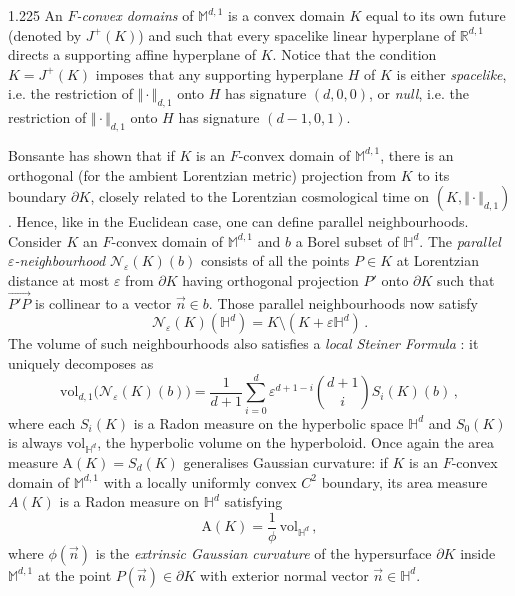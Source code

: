 \documentclass[reqno, a4paper]{amsart}
\numberwithin{equation}{section}
\numberwithin{figure}{section}
\theoremstyle{definition}
\theoremstyle{remark}
\newcommand{\R}{\mathbb{R}} %
\newcommand{\M}{\mathbb{M}} %
\renewcommand{\H}{\mathbb{H}} %
\newcommand{\vol}{\mathrm{vol}} %
\newcommand{\Area}{\mathrm{A}} %
\newcommand{\bp}[1]{{\bigl( {#1} \bigr)}} %
\begin{document}
\begin{spacing}{1.225}
An \emph{$F$-convex domains} of $\M^{d,1}$\cite{Fillastre_Veronelli_16,Bonsante_Fillastre_17} is a convex domain $K$ equal to its own future (denoted by $J^+(K)$) and such that every spacelike linear hyperplane of $\R^{d,1}$ directs a supporting affine hyperplane of $K$. Notice that the condition $K = J^+(K)$ imposes that any supporting hyperplane $H$ of $K$ is either \emph{spacelike}, i.e. the restriction of $\Vert\cdot\Vert_{d,1}$ onto $H$ has signature $(d,0,0)$, or \emph{null}, i.e. the restriction of $\Vert\cdot\Vert_{d,1}$ onto $H$ has signature $(d-1,0,1)$.

Bonsante has shown \cite[Proposition~4.3]{Bonsante_05} that if  $K$ is an $F$-convex domain of $\M^{d,1}$, there is an orthogonal (for the ambient Lorentzian metric) projection from $K$ to its boundary $\partial K$, closely related to the Lorentzian cosmological time on $(K,\Vert\cdot\Vert_{d,1})$ \cite{Andersson_Galloway_Howard_98}. Hence, like in the Euclidean case, one can define parallel neighbourhoods. Consider $K$ an $F$-convex domain of $\M^{d,1}$ and $b$ a Borel subset of $\mathbb{H}^d$. The \emph{parallel $\varepsilon$-neighbourhood} $\mathcal{N}_\varepsilon(K)(b)$ consists of all the points $P \in K$ at Lorentzian distance at most $\varepsilon$ from $\partial K$ having orthogonal projection $P'$ onto $\partial K$ such that $\overrightarrow{P'P}$ is collinear to a vector $\vec{n} \in b$. Those parallel neighbourhoods now satisfy
\begin{equation*}
    \mathcal{N}_\varepsilon(K)(\H^d) = K \setminus(K+ \varepsilon \H^d) \,.
\end{equation*}
The volume of such neighbourhoods also satisfies a \emph{local Steiner Formula} \cite{Fillastre_Veronelli_16}: it uniquely decomposes as
\begin{equation*}
\vol_{d,1}\bp{\mathcal{N}_\varepsilon(K)(b)} = \frac{1}{d+1}\sum_{i=0}^{d}\varepsilon^{d+1-i} \binom{d+1}{i} S_i(K)(b) \, , 
\end{equation*}
where each $S_i(K)$ is a Radon measure on the hyperbolic space $\H^d$ and $S_0(K)$ is always $\vol_{\H^d}$, the hyperbolic volume on the hyperboloid. Once again the area measure $\Area(K) = S_d(K)$ generalises Gaussian curvature: if $K$ is an $F$-convex domain of $\M^{d,1}$ with a locally uniformly convex $C^2$ boundary, its area measure $A(K)$ is a Radon measure on $\H^d$ satisfying
\begin{equation*}
 \Area(K) = \frac{1}{\phi} \, \vol_{\H^d} \, ,
\end{equation*}
where $\phi(\vec{n})$ is the \emph{extrinsic Gaussian curvature} of the hypersurface $\partial K$ inside  $\M^{d,1}$ at the point $P(\vec{n}) \in \partial K$ with exterior normal vector $\vec{n} \in \H^d$. 


\end{spacing}
\end{document}
